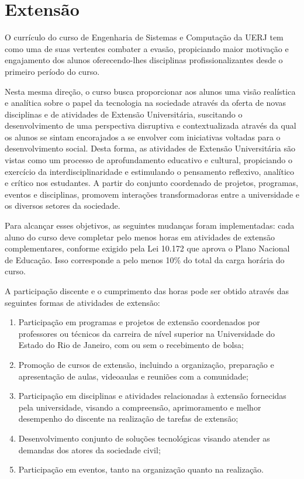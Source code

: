 \section{Extensão}

O currículo do curso de Engenharia de Sistemas e Computação da UERJ tem como uma de suas vertentes combater a evasão, propiciando maior motivação e engajamento dos alunos oferecendo-lhes disciplinas profissionalizantes desde o primeiro período do curso. 

Nesta mesma direção, o curso busca proporcionar aos alunos uma visão realística e analítica sobre o papel da tecnologia na sociedade através da oferta de novas disciplinas e de atividades de Extensão Universitária, suscitando o desenvolvimento de uma perspectiva disruptiva e contextualizada através da qual os alunos se sintam encorajados a se envolver com iniciativas voltadas para o desenvolvimento social. Desta forma, as atividades de Extensão Universitária são vistas como um processo de aprofundamento educativo e cultural, propiciando o exercício da interdisciplinaridade e estimulando o pensamento reflexivo, analítico e crítico nos estudantes. A partir do conjunto coordenado de projetos, programas, eventos e disciplinas, promovem interações transformadoras entre a universidade e os diversos setores da sociedade.

Para alcançar esses objetivos, as seguintes mudanças foram implementadas: cada aluno do curso deve completar pelo menos \hextensao horas em atividades de extensão complementares, conforme exigido pela Lei 10.172 que aprova o Plano Nacional de Educação. Isso corresponde a pelo menos 10\% do total da carga horária do curso.

A participação discente e o cumprimento das horas pode ser obtido através das seguintes formas de atividades de extensão:
\begin{enumerate}[label=\Roman*.]
    \item Participação em programas e projetos de extensão coordenados por professores ou técnicos da carreira de nível superior na Universidade do Estado do Rio de Janeiro, com ou sem o recebimento de bolsa;
    \item Promoção de cursos de extensão, incluindo a organização, preparação e apresentação de aulas, videoaulas e reuniões com a comunidade;
    \item Participação em disciplinas e atividades relacionadas à extensão fornecidas pela universidade, visando a compreensão, aprimoramento e melhor desempenho do discente na realização de tarefas de extensão;
    \item Desenvolvimento conjunto de soluções tecnológicas visando atender as demandas dos atores da sociedade civil;
    \item Participação em eventos, tanto na organização quanto na realização.
\end{enumerate}

